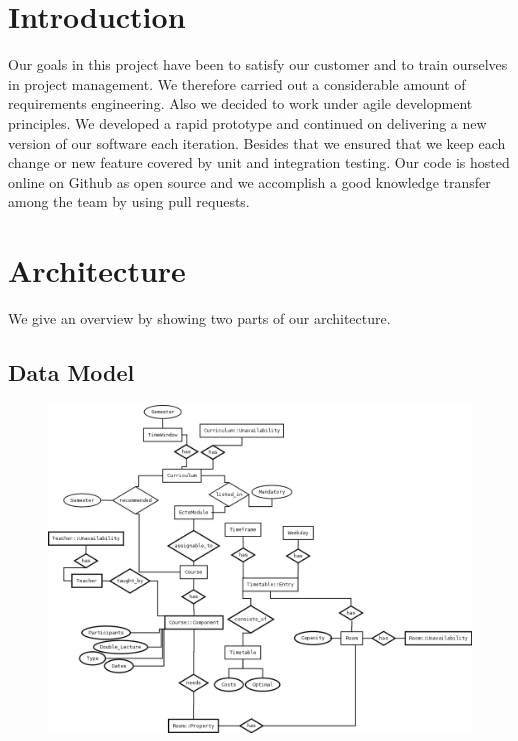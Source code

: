 \documentclass[12pt]{article} %
\begin{document}

\tableofcontents %

\newpage %


\section{Introduction} 

Our goals in this project have been to satisfy our customer and to train ourselves in project management.
We therefore carried out a considerable amount of requirements engineering.
Also we decided to work under agile development principles.
We developed a rapid prototype and continued on delivering a new version of our software each iteration.
Besides that we ensured that we keep each change or new feature covered by unit and integration testing.
Our code is hosted online on Github as open source and we accomplish a good knowledge transfer among the team by using pull requests.



\section{Architecture} %

We give an overview by showing two parts of our architecture.

\subsection{Data Model} 

\begin{figure}[h]
    \includegraphics[width=\textwidth]{TimetablingER_Dia.png}
    \label{fig:schema}
\end{figure}
\end{document}
